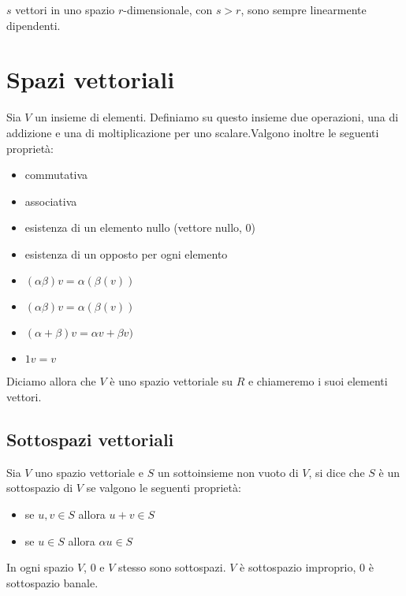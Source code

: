 \begin{property}
$s$ vettori in uno spazio $r$-dimensionale, con $s>r$, sono sempre linearmente dipendenti.
\end{property}


\section{Spazi vettoriali}

\begin{definition}
Sia $V$ un insieme di elementi. Definiamo su questo insieme due operazioni, una di addizione e una di moltiplicazione per uno scalare.Valgono inoltre le seguenti proprietà:
\begin{itemize}
\item commutativa
\item associativa
\item esistenza di un elemento nullo (vettore nullo, 0)
\item esistenza di un opposto per ogni elemento
\item $(\alpha\beta)v = \alpha(\beta(v))$
\item $(\alpha\beta)v = \alpha(\beta(v))$
\item $(\alpha+\beta)v = \alpha v + \beta v)$
\item $1 v = v$
\end{itemize}
Diciamo allora che $V$ è uno spazio vettoriale su $R$ e chiameremo i suoi elementi vettori.
\end{definition}

\subsection{Sottospazi vettoriali}

\begin{definition}
Sia $V$ uno spazio vettoriale e $S$ un sottoinsieme non vuoto di $V$, si dice che $S$ è un sottospazio di $V$ se valgono le seguenti proprietà:
\begin{itemize}
\item se $u,v \in S$ allora $u+v \in S$
\item se $u \in S$ allora $\alpha u \in S$
\end{itemize}
\end{definition}

\begin{example}
In ogni spazio $V$, ${0}$ e $V$ stesso sono sottospazi. $V$ è sottospazio improprio, ${0}$ è sottospazio banale.
\end{example}


